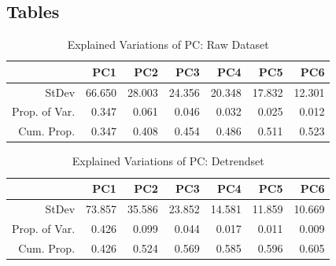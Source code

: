 \documentclass[11pt]{article}
\begin{document}
\subsection{Tables}
\begin{table}[ht]
	\centering
	\begin{tabular}{rrrrrrr}
		\hline
		& PC1 & PC2 & PC3 & PC4 & PC5 & PC6 \\ 
		\hline
		StDev & 66.650 & 28.003 & 24.356 & 20.348 & 17.832 & 12.301 \\ 
		Prop. of Var. & 0.347 & 0.061 & 0.046 & 0.032 & 0.025 & 0.012 \\ 
		Cum. Prop.& 0.347 & 0.408 & 0.454 & 0.486 & 0.511 & 0.523 \\ 
		\hline
	\end{tabular}
	\caption{Explained Variations of PC: Raw Dataset}\label{table:rawdataprop}
\end{table}
\begin{table}[ht]
	\centering
	\begin{tabular}{rrrrrrr}
		\hline
		& PC1 & PC2 & PC3 & PC4 & PC5 & PC6 \\ 
		\hline
		StDev & 73.857 & 35.586 & 23.852 & 14.581 & 11.859 & 10.669 \\ 
		Prop. of Var. & 0.426 & 0.099 & 0.044 & 0.017 & 0.011 & 0.009 \\ 
		Cum. Prop. & 0.426 & 0.524 & 0.569 & 0.585 & 0.596 & 0.605 \\ 
		\hline
	\end{tabular}
	\caption{Explained Variations of PC: Detrendset}\label{table:detrendprop}
\end{table}
\pagebreak
\end{document}
